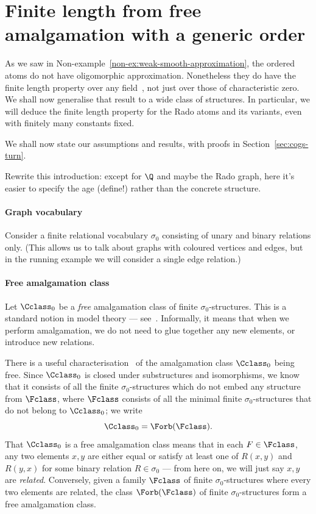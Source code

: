 \section{Finite length from free amalgamation with a generic order}\label{sec:free-amalg}
\newcommand{\cal}{\mathcal}

As we saw in Non-example~\ref{non-ex:weak-smooth-approximation}, the ordered atoms do not have oligomorphic approximation. 
Nonetheless they do have the finite length property over any field~\cite[Thm.~4.8]{BFKM24}, not just over those of characteristic zero. 
We shall now generalise that result to a wide class of structures. 
In particular, we will deduce the finite length property for the Rado atoms and its variants, even with finitely many constants fixed.

We shall now state our assumptions and results, with proofs in Section~\ref{sec:cogs-turn}.

Rewrite this introduction: except for $\Q$ and maybe the Rado graph, 
here it's easier to specify the age (define!) rather than the concrete structure.

\paragraph*{Graph vocabulary}
Consider a finite relational vocabulary $\sigma_0$ consisting of unary and binary relations only.
(This allows us to talk about graphs with coloured vertices and edges, but in the running example we will consider a single edge relation.)

\paragraph*{Free amalgamation class}
Let $\Cclass_0$ be a \emph{free} amalgamation class of finite $\sigma_0$-structures. 
This is a standard notion in model theory --- see~\cite[Sec.~2.1]{Macpherson11}.
Informally, it means that when we perform amalgamation, we do not need to glue together any new elements, or introduce new relations.

There is a useful characterisation~\cite[Lem.~4.5]{SS20} of the amalgamation class $\Cclass_0$ being free.
Since $\Cclass_0$ is closed under substructures and isomorphisms, 
we know that it consists of all the finite $\sigma_0$-structures which do not embed any structure from $\Fclass$, 
where $\Fclass$ consists of all the minimal finite $\sigma_0$-structures that do not belong to $\Cclass_0$;
we write \[
    \Cclass_0 = \Forb(\Fclass).
\]
That $\Cclass_0$ is a free amalgamation class means that in each $F \in \Fclass$, 
any two elements $x, y$ are either equal or satisfy at least one of $R(x, y)$ and $R(y, x)$ for some binary relation $R \in \sigma_0$
--- from here on, we will just say $x, y$ are \emph{related}.
Conversely, given a family $\Fclass$ of finite $\sigma_0$-structures where every two elements are related,
the class $\Forb(\Fclass)$ of finite $\sigma_0$-structures form a free amalgamation class.


